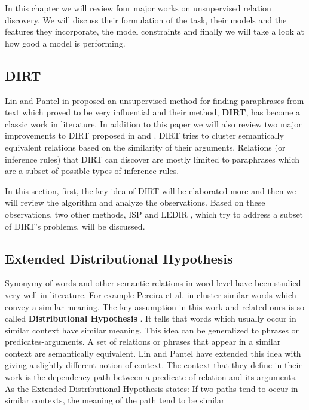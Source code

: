 In this chapter we will review four major works on unsupervised relation
discovery.
 We will discuss their formulation of the task, their models
 and the features they incorporate, the model constraints and finally we will take a look at how good a model is performing.


\subsection{DIRT}
\label{ssec:unsupervised}

Lin and Pantel in \cite{Lin2001} proposed an unsupervised method for finding paraphrases from text which  
proved to be very influential and their method, \textbf{DIRT}, has become a classic work in literature.
 In addition
 to this paper we will also review two major improvements to DIRT proposed in \cite{Bhagat2007} and \cite{Pantel2007}.
DIRT tries to cluster semantically equivalent relations based on the similarity of their arguments. Relations
(or inference rules) that DIRT can discover are mostly limited to paraphrases which are a subset of possible types of inference rules.

In this section, first, the key idea of DIRT will be elaborated more and then we will review the algorithm and analyze the observations.
Based on these observations, two other methods, ISP \cite{Pantel2007} and LEDIR \cite{Bhagat2007}, 
which try to address a subset of DIRT's problems, will be discussed.

\subsection{Extended Distributional Hypothesis}
\label{ssec:assumption}

Synonymy of words and other semantic relations in word level have been studied very well in literature.
For example Pereira et al. in \cite{Pereira1993} 
cluster similar words which convey a similar meaning. The key assumption in this work and related ones is so called
 \textbf{Distributional Hypothesis} \cite{Harris1981}
 . It tells that words which usually occur in similar context have similar meaning. This idea can be generalized
  to phrases or predicates-arguments. A set of relations or phrases that appear in a similar context
  are semantically equivalent. Lin and Pantel have extended this idea with giving a slightly different notion
   of context. The context that they define in their work is the dependency path between a predicate of
    relation and its arguments. As the Extended Distributional Hypothesis states:
     If two paths tend to occur in similar contexts, the meaning of the path tend to be similar 
    
